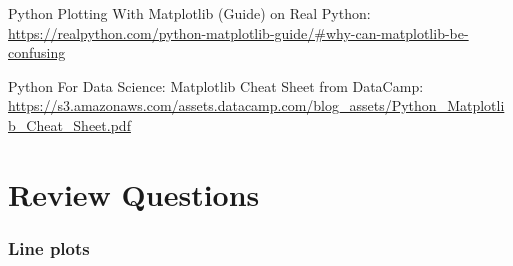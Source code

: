 \documentclass{book}
\begin{document}
Python Plotting With Matplotlib (Guide) on Real Python:
\url{https://realpython.com/python-matplotlib-guide/\#why-can-matplotlib-be-confusing}

Python For Data Science: Matplotlib Cheat Sheet from DataCamp:
\url{https://s3.amazonaws.com/assets.datacamp.com/blog_assets/Python_Matplotlib_Cheat_Sheet.pdf}
    




    
        \section{Review Questions}\label{review-questions}
    




    
        \subsubsection{Line plots}\label{line-plots}
    
\end{document}
